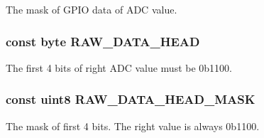 The mask of G\-P\-I\-O data of A\-D\-C value. \hypertarget{group___a_d_c_const_ga9392c719440ddaadb93274ea1991f5e3}{
\subsubsection[{R\-A\-W\-\_\-\-D\-A\-T\-A\-\_\-\-H\-E\-A\-D}]{\setlength{\rightskip}{0pt plus 5cm}const byte R\-A\-W\-\_\-\-D\-A\-T\-A\-\_\-\-H\-E\-A\-D}}\label{group___a_d_c_const_ga9392c719440ddaadb93274ea1991f5e3}
The first 4 bits of right A\-D\-C value must be 0b1100. \hypertarget{group___a_d_c_const_gac3583fffe9a0fb24d6fb98c9f9cc8a1c}{
\subsubsection[{R\-A\-W\-\_\-\-D\-A\-T\-A\-\_\-\-H\-E\-A\-D\-\_\-\-M\-A\-S\-K}]{\setlength{\rightskip}{0pt plus 5cm}const uint8 R\-A\-W\-\_\-\-D\-A\-T\-A\-\_\-\-H\-E\-A\-D\-\_\-\-M\-A\-S\-K}}\label{group___a_d_c_const_gac3583fffe9a0fb24d6fb98c9f9cc8a1c}
The mask of first 4 bits. The right value is always 0b1100. 